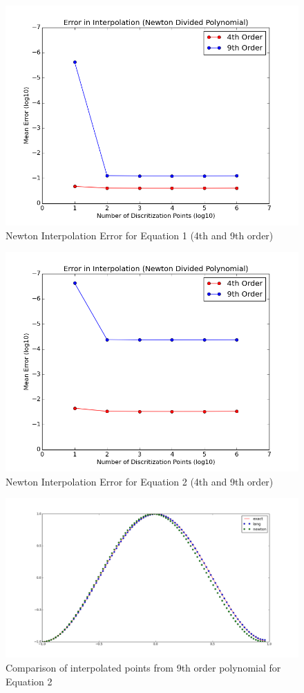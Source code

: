 \documentclass[preprint,12pt,3p]{elsarticle}
\begin{document}
\begin{figure}
\centering
\includegraphics[width=0.7\linewidth]{eq1_newton.png}
\caption{Newton Interpolation Error for Equation 1 (4th and 9th order)}
\label{fig:eq1_newton}
\end{figure}


\begin{figure}
\centering
\includegraphics[width=0.7\linewidth]{eq2_newton.png}
\caption{Newton Interpolation Error for Equation 2 (4th and 9th order)}
\label{fig:eq2_newton}
\end{figure}



\begin{figure}
\centering
\includegraphics[width=0.8\linewidth]{eq2_n9_m100.png}
\caption{Comparison of interpolated points from 9th order polynomial for Equation 2}
\label{fig:eq2_n9_m100.png}
\end{figure}
\end{document}
